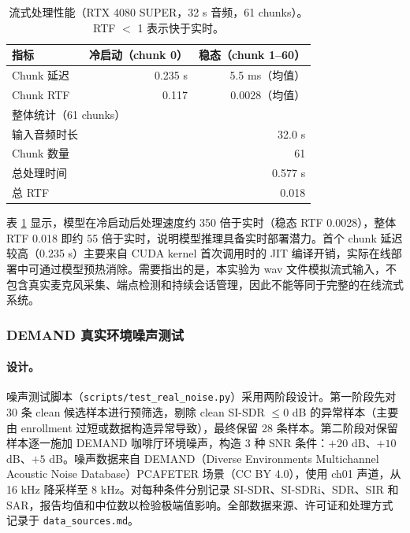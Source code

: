 \documentclass[UTF8,zihao=5,a4paper]{ctexart}
\newcommand{\sisdr}{SI-SDR}
\begin{document}
\begin{table}[H]
\centering
\begin{tabular}{lrr}
\toprule
指标 & 冷启动（chunk 0） & 稳态（chunk 1--60） \\
\midrule
Chunk 延迟 & 0.235 s & 5.5 ms（均值） \\
Chunk RTF & 0.117 & 0.0028（均值） \\
\bottomrule
\midrule
\multicolumn{3}{l}{整体统计（61 chunks）} \\
\midrule
输入音频时长 & \multicolumn{2}{r}{32.0 s} \\
Chunk 数量 & \multicolumn{2}{r}{61} \\
总处理时间 & \multicolumn{2}{r}{0.577 s} \\
总 RTF & \multicolumn{2}{r}{0.018} \\
\bottomrule
\end{tabular}
\caption{流式处理性能（RTX 4080 SUPER，32 s 音频，61 chunks）。RTF $<$ 1 表示快于实时。}
\label{tab:streaming}
\end{table}

表 \ref{tab:streaming} 显示，模型在冷启动后处理速度约 350 倍于实时（稳态 RTF 0.0028），整体 RTF 0.018 即约 55 倍于实时，说明模型推理具备实时部署潜力。首个 chunk 延迟较高（0.235 s）主要来自 CUDA kernel 首次调用时的 JIT 编译开销，实际在线部署中可通过模型预热消除。需要指出的是，本实验为 wav 文件模拟流式输入，不包含真实麦克风采集、端点检测和持续会话管理，因此不能等同于完整的在线流式系统。

\subsubsection{DEMAND 真实环境噪声测试}

\paragraph{设计。}
噪声测试脚本（\texttt{scripts/test\_real\_noise.py}）采用两阶段设计。第一阶段先对 30 条 clean 候选样本进行预筛选，剔除 clean SI-SDR $\le 0$ dB 的异常样本（主要由 enrollment 过短或数据构造异常导致），最终保留 28 条样本。第二阶段对保留样本逐一施加 DEMAND 咖啡厅环境噪声，构造 3 种 SNR 条件：$+20$ dB、$+10$ dB、$+5$ dB。噪声数据来自 DEMAND（Diverse Environments Multichannel Acoustic Noise Database）PCAFETER 场景（CC BY 4.0），使用 ch01 声道，从 16 kHz 降采样至 8 kHz。对每种条件分别记录 \sisdr{}、\sisdr{}i、SDR、SIR 和 SAR，报告均值和中位数以检验极端值影响。全部数据来源、许可证和处理方式记录于 \texttt{data\_sources.md}。
\end{document}
